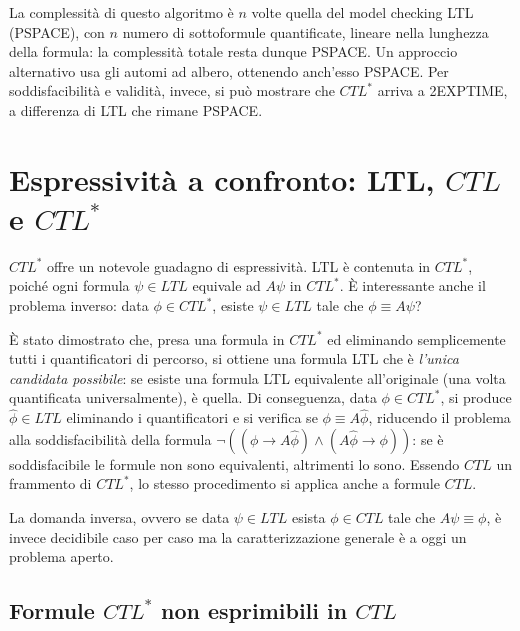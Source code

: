 La complessità di questo algoritmo è \(n\) volte quella del model checking LTL (PSPACE), con \(n\) numero di sottoformule quantificate, lineare nella lunghezza della formula: la complessità totale resta dunque PSPACE\@. Un approccio alternativo usa gli automi ad albero, ottenendo anch'esso PSPACE\@. Per soddisfacibilità e validità, invece, si può mostrare che \(CTL^*\) arriva a 2EXPTIME, a differenza di LTL che rimane PSPACE\@.

\section{Espressività a confronto: LTL, \(CTL\) e \texorpdfstring{\(CTL^*\)}{CTL*}}

\(CTL^*\) offre un notevole guadagno di espressività. LTL è contenuta in \(CTL^*\), poiché ogni formula \(\psi \in LTL\) equivale ad \(A \psi\) in \(CTL^*\). È interessante anche il problema inverso: data \(\phi \in CTL^*\), esiste \(\psi \in LTL\) tale che \(\phi \equiv A\psi\)?

È stato dimostrato che, presa una formula in \(CTL^*\) ed eliminando semplicemente tutti i quantificatori di percorso, si ottiene una formula LTL che è \emph{l'unica candidata possibile}: se esiste una formula LTL equivalente all'originale (una volta quantificata universalmente), è quella. Di conseguenza, data \(\phi \in CTL^*\), si produce \(\hat{\phi} \in LTL\) eliminando i quantificatori e si verifica se \(\phi \equiv A \hat{\phi}\), riducendo il problema alla soddisfacibilità della formula \(\neg ((\phi \to A \hat{\phi}) \land (A\hat{\phi} \to \phi))\): se è soddisfacibile le formule non sono equivalenti, altrimenti lo sono. Essendo \(CTL\) un frammento di \(CTL^*\), lo stesso procedimento si applica anche a formule \(CTL\)\@.

La domanda inversa, ovvero se data \(\psi \in LTL\) esista \(\phi \in CTL\) tale che \(A\psi \equiv \phi\), è invece decidibile caso per caso ma la caratterizzazione generale è a oggi un problema aperto.

\subsection{Formule \texorpdfstring{\(CTL^*\)}{CTL*} non esprimibili in \(CTL\)}

